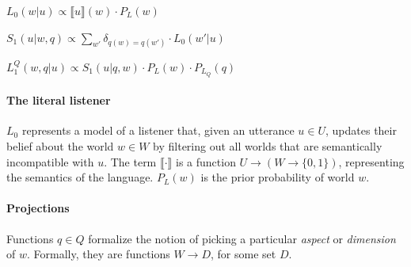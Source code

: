 \documentclass[9pt,twocolumn,twoside,lineno]{pnas-new}
\newcommand{\Listener}{L}
\newcommand{\QLONE}{\Listener_{{1}}^{{Q}}}
\begin{document}

	\begin{examples}
	\item $L_0(w\vert u) \propto \llbracket u \rrbracket (w)\cdot P_L(w)$ \label{defl0}
	\item $S_1(u\vert w,q) \propto \sum_{w'} \delta_{q(w)=q(w')} \cdot L_0(w'\vert u)$ \label{defs0}
	\item $\QLONE(w,q\vert u) \propto S_1(u\vert q,w)\cdot P_L(w)\cdot P_{L_Q}(q)$ \label{defl1}
	\end{examples}


	\paragraph{The literal listener} $L_0$ represents a model of a listener that, given an utterance $u\in U$, updates their belief about the world $w\in W$ by filtering out all worlds that are semantically incompatible with $u$. The term $\llbracket\cdot\rrbracket$ is a function $U\to(W\to\{0, 1\})$, representing the semantics of the language. $P_L(w)$ is the prior probability of world $w$. 


	\paragraph{Projections} 
	Functions $q\in Q$ formalize the notion of picking a particular \emph{aspect} or \emph{dimension} of $w$. Formally, they are functions $W \to D$, for some set $D$.
	
\end{document}
